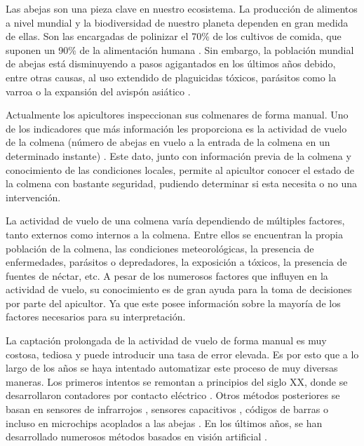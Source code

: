 
Las abejas son una pieza clave en nuestro ecosistema. La producción de
alimentos a nivel mundial y la biodiversidad de nuestro planeta dependen
en gran medida de ellas. Son las encargadas de polinizar el 70\% de los
cultivos de comida, que suponen un 90\% de la alimentación humana \citep{art:bees_decline}. 
Sin embargo, la población mundial de abejas
está disminuyendo a pasos agigantados en los últimos años debido, entre
otras causas, al uso extendido de plaguicidas tóxicos, parásitos como la
varroa o la expansión del avispón asiático \citep{art:ccd}.

Actualmente los apicultores inspeccionan sus colmenares de forma manual.
Uno de los indicadores que más información les proporciona es la
actividad de vuelo de la colmena (número de abejas en vuelo a la entrada
de la colmena en un determinado instante) \citep{art:campbell2008}. Este
dato, junto con información previa de la colmena y conocimiento de las
condiciones locales, permite al apicultor conocer el estado de la
colmena con bastante seguridad, pudiendo determinar si esta necesita o
no una intervención.

La actividad de vuelo de una colmena varía dependiendo de múltiples
factores, tanto externos como internos a la colmena. Entre ellos se
encuentran la propia población de la colmena, las condiciones
meteorológicas, la presencia de enfermedades, parásitos o depredadores,
la exposición a tóxicos, la presencia de fuentes de néctar, etc. A pesar
de los numerosos factores que influyen en la actividad de vuelo, su
conocimiento es de gran ayuda para la toma de decisiones por parte del
apicultor. Ya que este posee información sobre la mayoría de los
factores necesarios para su interpretación.

La captación prolongada de la actividad de vuelo de forma manual es muy
costosa, tediosa y puede introducir una tasa de error elevada. Es por
esto que a lo largo de los años se haya intentado automatizar este
proceso de muy diversas maneras. Los primeros intentos se remontan a
principios del siglo XX, donde se desarrollaron contadores por contacto
eléctrico \citep{art:lundie1925}. Otros métodos posteriores se basan en
sensores de infrarrojos \citep{art:struye1994}, sensores capacitivos
\citep{art:campbell2005}, códigos de barras \citep{beebarcode} o incluso
en microchips acoplados a las abejas
\citep{art:decourtye_honeybee_2011}. En los últimos años, se han
desarrollado numerosos métodos basados en visión artificial
\citep{art:campbell2008,art:chiron2013a,art:chiron2013,art:tashakkori2015}.


